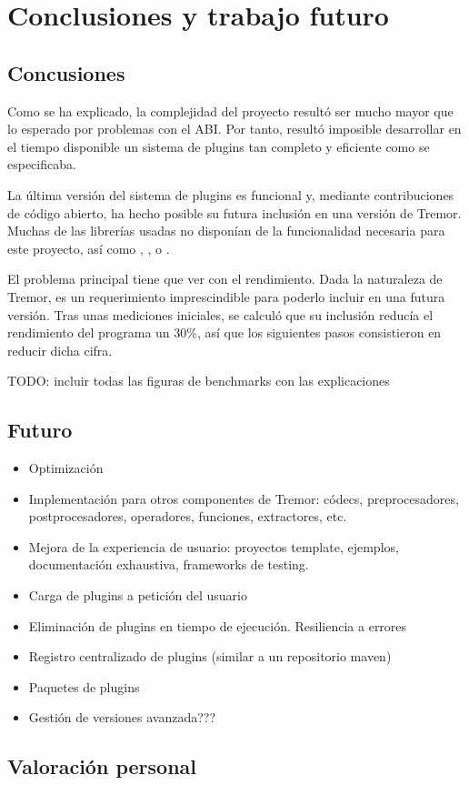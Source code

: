 
\chapter{Conclusiones y trabajo futuro}

\section{Concusiones}

Como se ha explicado, la complejidad del proyecto resultó ser mucho mayor que lo
esperado por problemas con el ABI. Por tanto, resultó imposible desarrollar en
el tiempo disponible un sistema de plugins tan completo y eficiente como se
especificaba.

La última versión del sistema de plugins es funcional y, mediante contribuciones
de código abierto, ha hecho posible su futura inclusión en una versión de
Tremor. Muchas de las librerías usadas no disponían de la funcionalidad
necesaria para este proyecto, así como , ,
 o .

El problema principal tiene que ver con el rendimiento. Dada la naturaleza de
Tremor, es un requerimiento imprescindible para poderlo incluir en una futura
versión. Tras unas mediciones iniciales, se calculó que su inclusión reducía el
rendimiento del programa un 30\%, así que los siguientes pasos consistieron en
reducir dicha cifra.

TODO: incluir todas las figuras de benchmarks con las explicaciones

\section{Futuro}

\begin{itemize}
    \item Optimización

    \item Implementación para otros componentes de Tremor: códecs,
        preprocesadores, postprocesadores, operadores, funciones, extractores,
        etc.

    \item Mejora de la experiencia de usuario: proyectos template, ejemplos,
        documentación exhaustiva, frameworks de testing.

    \item Carga de plugins a petición del usuario

    \item Eliminación de plugins en tiempo de ejecución. Resiliencia a errores

    \item Registro centralizado de plugins (similar a un repositorio maven)

    \item Paquetes de plugins

    \item Gestión de versiones avanzada???

\end{itemize}

\section{Valoración personal}
